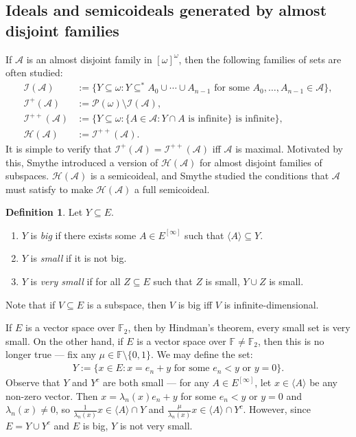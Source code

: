 \documentclass[11pt,reqno]{amsart}
\theoremstyle{plain}
\numberwithin{equation}{section}
\theoremstyle{definition}
\newtheorem{definition}[theorem]{Definition}
\renewcommand{\c}[1]{\langle #1 \rangle}
\newcommand{\Po}{\cal{P}}
\newcommand{\cal}{\mathcal}
\newcommand{\A}{\cal{A}}
\renewcommand{\H}{\cal{H}}
\newcommand{\I}{\cal{I}}
\begin{document}
\subsection{Ideals and semicoideals generated by almost disjoint families}
If $\A$ is an almost disjoint family in $[\omega]^\omega$, then the following families of sets are often studied:
\begin{align*}
    \I(\A) &:= \{Y \subseteq \omega : Y \subseteq^* A_0 \cup \cdots \cup A_{n-1} \text{ for some $A_0,\dots,A_{n-1} \in \A$}\}, \\
    \I^+(\A) &:= \Po(\omega) \setminus \I(\A), \\
    \I^{++}(\A) &:= \{Y \subseteq \omega : \{A \in \A : Y \cap A \text{ is infinite}\} \text{ is infinite}\}, \\
    \H(\A) &:= \I^{++}(\A).
\end{align*}
It is simple to verify that $\I^+(\A) = \I^{++}(\A)$ iff $\A$ is maximal. Motivated by this, Smythe introduced a version of $\H(\A)$ for almost disjoint families of subspaces. $\H(\A)$ is a semicoideal, and Smythe studied the 
conditions that $\A$ must satisfy to make $\H(\A)$ a full semicoideal. 

\begin{definition}
    Let $Y \subseteq E$.
    \begin{enumerate}
        \item $Y$ is \emph{big} if there exists some $A \in E^{[\infty]}$ such that $\c{A} \subseteq Y$.
        
        \item $Y$ is \emph{small} if it is not big.
        
        \item $Y$ is \emph{very small} if for all $Z \subseteq E$ such that $Z$ is small, $Y \cup Z$ is small.
    \end{enumerate}
\end{definition}

Note that if $V \subseteq E$ is a subspace, then $V$ is big iff $V$ is infinite-dimensional.

If $E$ is a vector space over $\mathbb{F}_2$, then by Hindman's theorem, every small set is very small. On the other hand, if $E$ is a vector space over $\mathbb{F} \neq \mathbb{F}_2$, then this is no longer true --- fix any $\mu \in \mathbb{F} \setminus \{0,1\}$. We may define the set:
\begin{align*}
    Y := \{x \in E : x = e_n + y \text{ for some $e_n < y$ or $y = 0$}\}.
\end{align*}
Observe that $Y$ and $Y^c$ are both small --- for any $A \in E^{[\infty]}$, let $x \in \c{A}$ be any non-zero vector. Then $x = \lambda_n(x)e_n + y$ for some $e_n < y$ or $y = 0$ and $\lambda_n(x) \neq 0$, so $\frac{1}{\lambda_n(x)}x \in \c{A} \cap Y$ and $\frac{\mu}{\lambda_n(x)}x \in \c{A} \cap Y^c$. However, since $E = Y \cup Y^c$ and $E$ is big, $Y$ is not very small. 
\end{document}

